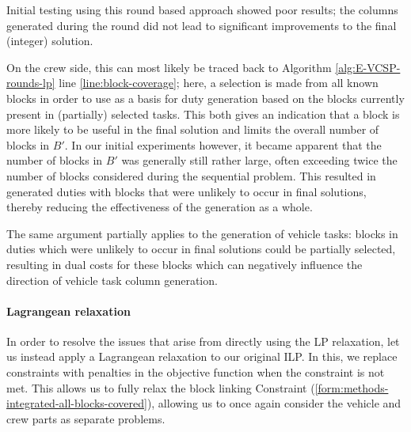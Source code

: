 \documentclass[]{article}
\begin{document}
Initial testing using this round based approach showed poor results; the columns generated during the round did not lead to significant improvements to the final (integer) solution. 

On the crew side, this can most likely be traced back to Algorithm \ref{alg:E-VCSP-rounds-lp} line {\ref{line:block-coverage}}; here, a selection is made from all known blocks in order to use as a basis for duty generation based on the blocks currently present in (partially) selected tasks. This both gives an indication that a block is more likely to be useful in the final solution and limits the overall number of blocks in $B'$. In our initial experiments however, it became apparent that the number of blocks in $B'$ was generally still rather large, often exceeding twice the number of blocks considered during the sequential problem. This resulted in generated duties with blocks that were unlikely to occur in final solutions, thereby reducing the effectiveness of the generation as a whole.

The same argument partially applies to the generation of vehicle tasks: blocks in duties which were unlikely to occur in final solutions could be partially selected, resulting in dual costs for these blocks which can negatively influence the direction of vehicle task column generation. 

\paragraph{Lagrangean relaxation}
In order to resolve the issues that arise from directly using the LP relaxation, let us instead apply a Lagrangean relaxation to our original ILP. In this, we replace constraints with penalties in the objective function when the constraint is not met. This allows us to fully relax the block linking Constraint (\ref{form:methods-integrated-all-blocks-covered}), allowing us to once again consider the vehicle and crew parts as separate problems. 
\end{document}
